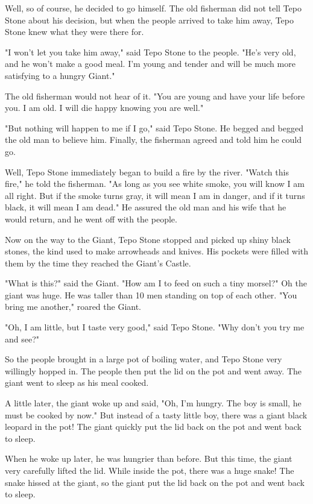 Well, so of course, he decided to go himself. The old fisherman did not tell Tepo Stone about his decision, but when the people arrived to take him away, Tepo Stone knew what they were there for.

"I won't let you take him away," said Tepo Stone to the people. "He's very old, and he won't make a good meal. I'm young and tender and will be much more satisfying to a hungry Giant."

The old fisherman would not hear of it. "You are young and have your life before you. I am old. I will die happy knowing you are well."

"But nothing will happen to me if I go," said Tepo Stone. He begged and begged the old man to believe him. Finally, the fisherman agreed and told him he could go.

Well, Tepo Stone immediately began to build a fire by the river. "Watch this fire," he told the fisherman. "As long as you see white smoke, you will know I am all right. But if the smoke turns gray, it will mean I am in danger, and if it turns black, it will mean I am dead." He assured the old man and his wife that he would return, and he went off with the people.

Now on the way to the Giant, Tepo Stone stopped and picked up shiny black stones, the kind used to make arrowheads and knives. His pockets were filled with them by the time they reached the Giant's Castle.

"What is this?" said the Giant. "How am I to feed on such a tiny morsel?" Oh the giant was huge. He was taller than 10 men standing on top of each other. "You bring me another," roared the Giant.

"Oh, I am little, but I taste very good," said Tepo Stone. "Why don't you try me and see?"

So the people brought in a large pot of boiling water, and Tepo Stone very willingly hopped in. The people then put the lid on the pot and went away. The giant went to sleep as his meal cooked.

A little later, the giant woke up and said, "Oh, I'm hungry. The boy is small, he must be cooked by now." But instead of a tasty little boy, there was a giant black leopard in the pot! The giant quickly put the lid back on the pot and went back to sleep.

When he woke up later, he was hungrier than before. But this time, the giant very carefully lifted the lid. While inside the pot, there was a huge snake! The snake hissed at the giant, so the giant put the lid back on the pot and went back to sleep.

